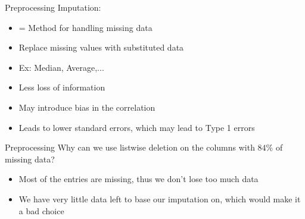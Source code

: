 \documentclass{beamer}
\begin{document}
	\begin{frame}{Preprocessing}
		Imputation:
		\begin{itemize}
			\item = Method for handling missing data
			\item Replace missing values with substituted data
			\item Ex: Median, Average,...
			\item Less loss of information
			\item May introduce bias in the correlation
			\item Leads to lower standard errors, which may lead to Type 1 errors
		\end{itemize}
	\end{frame}

	\begin{frame}{Preprocessing}
		Why can we use listwise deletion on the columns with $84\%$ of missing data?
		\begin{itemize}
			\item Most of the entries are missing, thus we don't lose too much data
			\item We have very little data left to base our imputation on, which would make it a bad choice
		\end{itemize}
	\end{frame}
\end{document}

